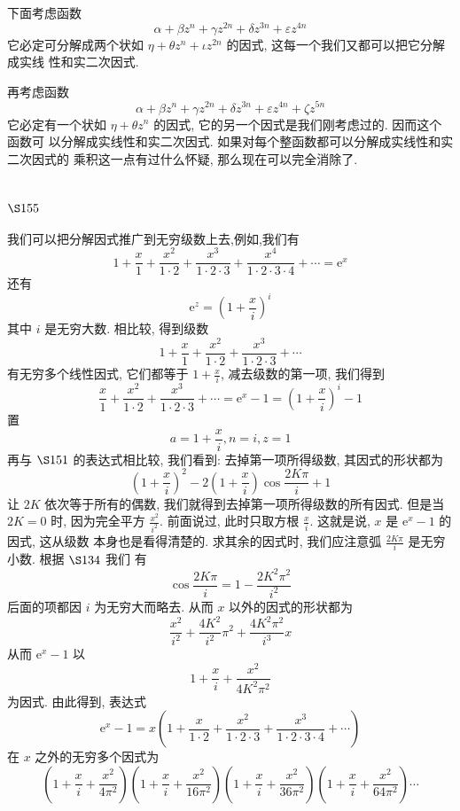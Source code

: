 下面考虑函数
\[
\alpha+\beta z^{n}+\gamma z^{2 n}+\delta z^{3 n}+\varepsilon z^{4 n}
\]
它必定可分解成两个状如 $\eta+\theta z^{n}+\iota z^{2 n}$ 的因式, 这每一个我们又都可以把它分解成实线 性和实二次因式.

再考虑函数
\[
\alpha+\beta z^{n}+\gamma z^{2 n}+\delta z^{3 n}+\varepsilon z^{4 n}+\zeta z^{5 n}
\]
它必定有一个状如 $\eta+\theta z^{n}$ 的因式, 它的另一个因式是我们刚考虑过的. 因而这个函数可 以分解成实线性和实二次因式. 如果对每个整函数都可以分解成实线性和实二次因式的 乘积这一点有过什么怀疑, 那么现在可以完全消除了.

\section{$\S 155$}

我们可以把分解因式推广到无穷级数上去,例如,我们有
\[
1+\frac{x}{1}+\frac{x^{2}}{1 \cdot 2}+\frac{x^{3}}{1 \cdot 2 \cdot 3}+\frac{x^{4}}{1 \cdot 2 \cdot 3 \cdot 4}+\cdots=\mathrm{e}^{x}
\]
还有
\[
\mathrm{e}^{z}=\left(1+\frac{x}{i}\right)^{i}
\]
其中 $i$ 是无穷大数. 相比较, 得到级数
\[
1+\frac{x}{1}+\frac{x^{2}}{1 \cdot 2}+\frac{x^{3}}{1 \cdot 2 \cdot 3}+\cdots
\]
有无穷多个线性因式, 它们都等于 $1+\frac{x}{i}$, 减去级数的第一项, 我们得到
\[
\frac{x}{1}+\frac{x^{2}}{1 \cdot 2}+\frac{x^{3}}{1 \cdot 2 \cdot 3}+\cdots=\mathrm{e}^{x}-1=\left(1+\frac{x}{i}\right)^{i}-1
\]
置
\[
a=1+\frac{x}{i}, n=i, z=1
\]
再与 $\S 151$ 的表达式相比较, 我们看到: 去掉第一项所得级数, 其因式的形状都为
\[
\left(1+\frac{x}{i}\right)^{2}-2\left(1+\frac{x}{i}\right) \cos \frac{2 K \pi}{i}+1
\]
让 $2 K$ 依次等于所有的偶数, 我们就得到去掉第一项所得级数的所有因式. 但是当 $2 K=0$ 时, 因为完全平方 $\frac{x^{2}}{i^{2}}$. 前面说过, 此时只取方根 $\frac{x}{i}$. 这就是说, $x$ 是 $\mathrm{e}^{x}-1$ 的因式, 这从级数 本身也是看得清楚的. 求其余的因式时, 我们应注意弧 $\frac{2 K \pi}{i}$ 是无穷小数. 根据 $\S 134$ 我们 有
\[
\cos \frac{2 K \pi}{i}=1-\frac{2 K^{2} \pi^{2}}{i^{2}}
\]
后面的项都因 $i$ 为无穷大而略去. 从而 $x$ 以外的因式的形状都为
\[
\frac{x^{2}}{i^{2}}+\frac{4 K^{2}}{i^{2}} \pi^{2}+\frac{4 K^{2} \pi^{2}}{i^{3}} x
\]
从而 $\mathrm{e}^{x}-1$ 以
\[
1+\frac{x}{i}+\frac{x^{2}}{4 K^{2} \pi^{2}}
\]
为因式. 由此得到, 表达式
\[
\mathrm{e}^{x}-1=x\left(1+\frac{x}{1 \cdot 2}+\frac{x^{2}}{1 \cdot 2 \cdot 3}+\frac{x^{3}}{1 \cdot 2 \cdot 3 \cdot 4}+\cdots\right)
\]
在 $x$ 之外的无穷多个因式为
\[
\left(1+\frac{x}{i}+\frac{x^{2}}{4 \pi^{2}}\right)\left(1+\frac{x}{i}+\frac{x^{2}}{16 \pi^{2}}\right)\left(1+\frac{x}{i}+\frac{x^{2}}{36 \pi^{2}}\right)\left(1+\frac{x}{i}+\frac{x^{2}}{64 \pi^{2}}\right) \cdots
\]
